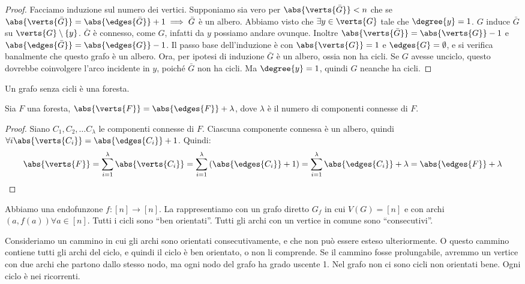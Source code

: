 \begin{proof}
	Facciamo induzione sul numero dei vertici.
	Supponiamo sia vero per $\abs{\verts{\bar{G}}} < n$ che se $\abs{\verts{\bar{G}}} = \abs{\edges{\bar{G}}} + 1 \implies \bar{G}$ \`e un albero.
	Abbiamo visto che $\exists y \in \verts{G}$ tale che $\degree{y} = 1$.
	$G$ induce $\bar{G}$ su $\verts{G} \setminus \{y\}$.
	$\bar{G}$ \`e connesso, come $G$, infatti da $y$ possiamo andare ovunque.
	Inoltre $\abs{\verts{\bar{G}}} = \abs{\verts{G}} - 1$ e $\abs{\edges{\bar{G}}} = \abs{\edges{G}} - 1$.
	Il passo base dell'induzione \`e con $\abs{\verts{G}} = 1$ e $\edges{G} = \emptyset$, e si verifica banalmente che questo grafo \`e un albero.
	Ora, per ipotesi di induzione $\bar{G}$ \`e un albero, ossia non ha cicli.
	Se $G$ avesse unciclo, questo dovrebbe coinvolgere l'arco incidente in $y$, poich\'e $\bar{G}$ non ha cicli.
	Ma $\degree{y} = 1$, quindi $G$ neanche ha cicli.
\end{proof}

\begin{defn}
	Un grafo senza cicli \`e una foresta.
\end{defn}

\begin{oss}
	Sia $F$ una foresta, $\abs{\verts{F}} = \abs{\edges{F}} + \lambda$, dove $\lambda$ \`e il numero di componenti connesse di $F$.
\end{oss}

\begin{proof}
	Siano $C_1, C_2, \dots C_{\lambda}$ le componenti connesse di $F$.
	Ciascuna componente connessa \`e un albero, quindi $\forall i \abs{\verts{C_i}} = \abs{\edges{C_i}} + 1$.
	Quindi:
	\begin{align*}
		\abs{\verts{F}} =
		\sum_{i = 1}^{\lambda} \abs{\verts{C_i}} =
		\sum_{i = 1}^{\lambda} \left( \abs{\edges{C_i}} + 1 \right) =
		\sum_{i = 1}^{\lambda} \abs{\edges{C_i}} + \lambda =
		\abs{\edges{F}} + \lambda
	\end{align*}
\end{proof}

\newpage


Abbiamo una endofunzone $f : [n] \to [n]$.
La rappresentiamo con un grafo diretto $G_f$ in cui $V(G) = [n]$ e con archi $(a, f(a)) \forall a \in [n]$.
Tutti i cicli sono ``ben orientati''.
Tutti gli archi con un vertice in comune sono ``consecutivi''.

Consideriamo un cammino in cui gli archi sono orientati consecutivamente, e che non pu\`o essere esteso ulteriormente.
O questo cammino contiene tutti gli archi del ciclo, e quindi il ciclo \`e ben orientato, o non li comprende.
Se il cammino fosse prolungabile, avremmo un vertice con due archi che partono dallo stesso nodo, ma ogni nodo del grafo ha grado uscente 1.
Nel grafo non ci sono cicli non orientati bene.
Ogni ciclo \`e nei ricorrenti.

